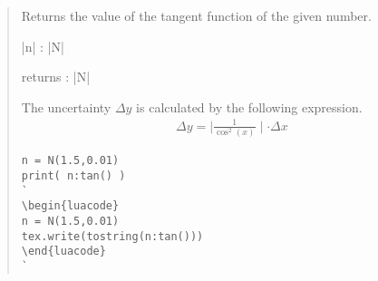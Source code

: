 \documentclass{ltxdoc}
\begin{document}
\begin{quote}
  Returns the value of the tangent function of the given number.

  \begin{description}
  \item |n| : |N|

  \item returns : |N|
  \end{description}

  The uncertainty $\Delta y$ is calculated by the following expression.
  \begin{align*}
    \Delta y = \mid \frac{1}{\cos^2(x)} \mid \cdot \Delta x
  \end{align*}  


\begin{lstlisting}
n = N(1.5,0.01)
print( n:tan() )
`
\begin{luacode}
n = N(1.5,0.01)
tex.write(tostring(n:tan()))
\end{luacode}
`
\end{lstlisting}

\end{quote}





\newpage
{}




\newpage
{}
\indexprologue{}
\printindex[unit]

\newpage
{}
\indexprologue{}
\printindex[cur]

\newpage
{}
\indexprologue{}
\printindex[lua]
\end{document}
